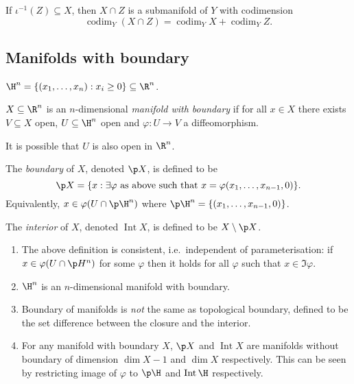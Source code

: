 \documentclass[a4paper]{article}
\DeclareMathOperator{\codim}{codim}
\DeclareMathOperator{\Int}{Int}
\begin{document}
\begin{corollary}
  If \(\iota^{-1}(Z) \subseteq X\), then \(X \cap Z\) is a submanifold of \(Y\) with codimension
  \[
    \codim_Y(X \cap Z) = \codim_Y X + \codim_Y Z.
  \]
\end{corollary}

\subsection{Manifolds with boundary}

\begin{notation}
  \(\H^n = \{(x_1, \dots, x_n): x_i \geq 0\} \subseteq \R^n\).
\end{notation}

\begin{definition}
  \(X \subseteq \R^n\) is an \(n\)-dimensional \emph{manifold with boundary} if for all \(x \in X\) there exists \(V \subseteq X\) open, \(U \subseteq \H^n\) open and \(\varphi: U \to V\) a diffeomorphism.
\end{definition}

It is possible that \(U\) is also open in \(\R^n\).

\begin{definition}
  The \emph{boundary} of \(X\), denoted \(\p X\), is defined to be
  \[
    \p X = \{x: \exists \varphi \text{ as above such that } x = \varphi(x_1, \dots, x_{n - 1}, 0)\}.
  \]
  Equivalently, \(x \in \varphi(U \cap \p \H^n)\) where \(\p \H^n = \{(x_1, \dots, x_{n - 1}, 0)\}\).

  The \emph{interior} of \(X\), denoted \(\Int X\), is defined to be \(X \setminus \p X\).
\end{definition}



\begin{remark}\leavevmode
  \begin{enumerate}
  \item The above definition is consistent, i.e.\ independent of parameterisation: if \(x \in \varphi(U \cap \p H^n)\) for some \(\varphi\) then it holds for all \(\varphi\) such that \(x \in \Im \varphi\).
  \item \(\H^n\) is an \(n\)-dimensional manifold with boundary.
  \item Boundary of manifolds is \emph{not} the same as topological boundary, defined to be the set difference between the closure and the interior.
  \item For any manifold with boundary \(X\), \(\p X\) and \(\Int X\) are manifolds without boundary of dimension \(\dim X - 1\) and \(\dim X\) respectively. This can be seen by restricting image of \(\varphi\) to \(\p \H\) and \(\Int \H\) respectively.
  \end{enumerate}
\end{remark}
\end{document}
